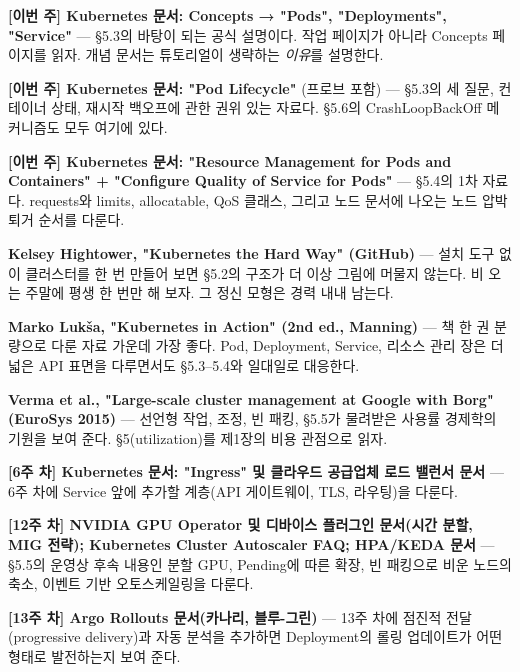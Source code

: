 \begin{tbbitemize}
  \item \textbf{[이번 주] Kubernetes 문서: Concepts → "Pods", "Deployments", "Service"} — §5.3의 바탕이 되는 공식 설명이다. 작업 페이지가 아니라 Concepts 페이지를 읽자. 개념 문서는 튜토리얼이 생략하는 \textit{이유}를 설명한다.
  \item \textbf{[이번 주] Kubernetes 문서: "Pod Lifecycle"} (프로브 포함) — §5.3의 세 질문, 컨테이너 상태, 재시작 백오프에 관한 권위 있는 자료다. §5.6의 CrashLoopBackOff 메커니즘도 모두 여기에 있다.
  \item \textbf{[이번 주] Kubernetes 문서: "Resource Management for Pods and Containers" + "Configure Quality of Service for Pods"} — §5.4의 1차 자료다. requests와 limits, allocatable, QoS 클래스, 그리고 노드 문서에 나오는 노드 압박 퇴거 순서를 다룬다.
  \item \textbf{Kelsey Hightower, "Kubernetes the Hard Way" (GitHub)} — 설치 도구 없이 클러스터를 한 번 만들어 보면 §5.2의 구조가 더 이상 그림에 머물지 않는다. 비 오는 주말에 평생 한 번만 해 보자. 그 정신 모형은 경력 내내 남는다.
  \item \textbf{Marko Lukša, "Kubernetes in Action" (2nd ed., Manning)} — 책 한 권 분량으로 다룬 자료 가운데 가장 좋다. Pod, Deployment, Service, 리소스 관리 장은 더 넓은 API 표면을 다루면서도 §5.3–5.4와 일대일로 대응한다.
  \item \textbf{Verma et al., "Large-scale cluster management at Google with Borg" (EuroSys 2015)} — 선언형 작업, 조정, 빈 패킹, §5.5가 물려받은 사용률 경제학의 기원을 보여 준다. §5(utilization)를 제1장의 비용 관점으로 읽자.
  \item \textbf{[6주 차] Kubernetes 문서: "Ingress" 및 클라우드 공급업체 로드 밸런서 문서} — 6주 차에 Service 앞에 추가할 계층(API 게이트웨이, TLS, 라우팅)을 다룬다.
  \item \textbf{[12주 차] NVIDIA GPU Operator 및 디바이스 플러그인 문서(시간 분할, MIG 전략); Kubernetes Cluster Autoscaler FAQ; HPA/KEDA 문서} — §5.5의 운영상 후속 내용인 분할 GPU, Pending에 따른 확장, 빈 패킹으로 비운 노드의 축소, 이벤트 기반 오토스케일링을 다룬다.
  \item \textbf{[13주 차] Argo Rollouts 문서(카나리, 블루-그린)} — 13주 차에 점진적 전달(progressive delivery)과 자동 분석을 추가하면 Deployment의 롤링 업데이트가 어떤 형태로 발전하는지 보여 준다.
\end{tbbitemize}

\vspace{5.0pt}

